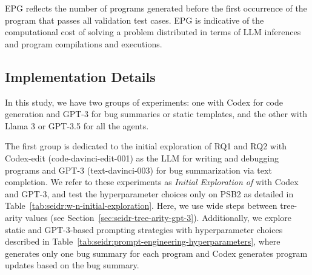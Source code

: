 EPG reflects the number of programs generated before the first occurrence of the program that passes all validation test cases.
EPG is indicative of the computational cost of solving a problem distributed in terms of LLM inferences and program compilations and executions.

\subsection{Implementation Details}
\label{sec:seidr-implementation}


In this study, we have two groups of experiments: one with Codex for code generation and GPT-3 for bug summaries or static templates, and the other with Llama 3 or GPT-3.5 for all the agents. 

The first group is dedicated to the initial exploration of RQ1 and RQ2 with Codex-edit (code-davinci-edit-001) as the LLM for writing and debugging programs and GPT-3 (text-davinci-003) for bug summarization via text completion. 
We refer to these experiments as \emph{Initial Exploration of \method{}} with Codex and GPT-3, and test the hyperparameter choices only on PSB2 as detailed in Table~\ref{tab:seidr:w-n-initial-exploration}.
Here, we use wide steps between tree-arity values (see Section~\ref{sec:seidr-tree-arity-gpt-3}).
Additionally, we explore static and GPT-3-based prompting strategies with hyperparameter choices described in Table~\ref{tab:seidr:prompt-engineering-hyperparameters}, where \synthmodelnoargs{} generates only one bug summary for each program and Codex generates \treearity{} program updates based on the bug summary.
 
